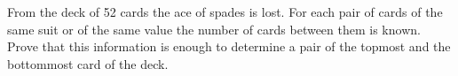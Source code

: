 \problem
From the deck of 52 cards the ace of spades is lost.
For each pair of cards of the same suit or of the same value the number of
cards between them is known.
Prove that this information is enough to determine a pair of the topmost and
the bottommost card of the deck.

\solution

\endproblem
